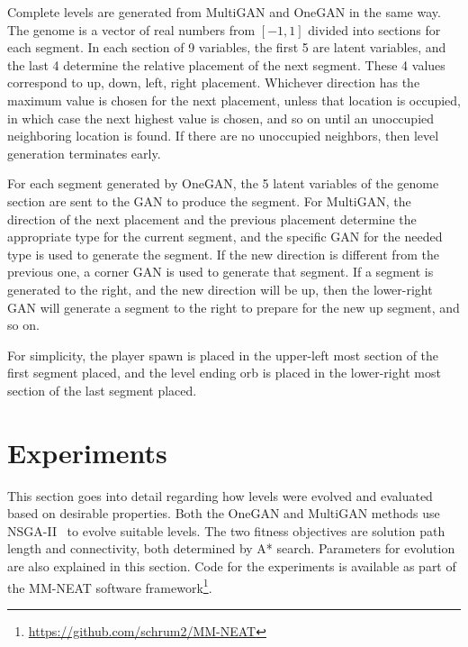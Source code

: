 Complete levels are generated from MultiGAN and OneGAN in the same way. 
The genome is a vector of real numbers from $[-1,1]$ divided into sections for each segment. In each section of 9 variables, the first 5 are latent variables, and the last 4 determine the relative placement of the next segment. These 4 values correspond to up, down, left, right placement. Whichever direction has the maximum value is chosen for the next placement, unless that location is occupied, in which case the next highest value is chosen, and so on until an unoccupied neighboring location is found. If there are no unoccupied neighbors, then level generation terminates early.

For each segment generated by OneGAN, the 5 latent variables of the genome section are sent to the GAN to produce the segment. For MultiGAN, the direction of the next placement and the previous placement determine the appropriate type for the current segment, and the specific GAN for the needed type is used to generate the segment. If the new direction is different from the previous one, a corner GAN is used to generate that segment. If a segment is generated to the right, and the new direction will be up, then the lower-right GAN will generate a segment to the right to prepare for the new up segment, and so on.



For simplicity, the player spawn is placed in the upper-left most section of the first segment placed, and the level ending orb is placed in the lower-right most section of the last segment placed.

\section{Experiments}

This section goes into detail regarding how levels were evolved and evaluated based on desirable properties. Both the OneGAN and MultiGAN methods use NSGA-II~\cite{deb:tec02} to evolve suitable levels. The two fitness objectives are solution path length and connectivity, both determined by A* search. Parameters for evolution are also explained in this section. Code for the experiments is available as part of the MM-NEAT software framework\footnote{\url{https://github.com/schrum2/MM-NEAT}}.

